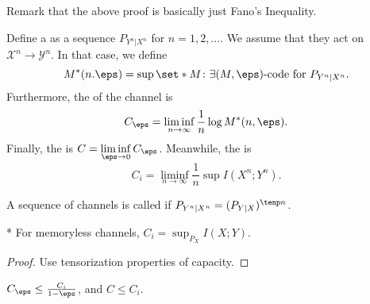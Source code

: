 Remark that the above proof is basically just Fano's Inequality.

\begin{defn}
	Define a  as a sequence $P_{Y^n|X^n}$ for $n = 1, 2, \ldots$.
	We assume that they act on $\mathcal X^n \to \mathcal Y^n$.
	In that case, we define \[
		M^*(n.\eps) = \sup \set*{M\colon \exists (M,\eps)\text{-code for }P_{Y^n|X^n}}.
	\]
	Furthermore, the  of the channel is \[
		C_\eps = \liminf_{n\to \infty} \frac 1n \log M^*(n,\eps).
	\]
	Finally, the  is $C = \liminf\limits_{\eps\to 0} C_\eps$. Meanwhile, the  is \[
		C_i = \liminf_{n\to\infty} \frac 1n \sup I(X^n;Y^n).
	\]
\end{defn}

\begin{defn}
	A sequence of channels is called  if $P_{Y^n|X^n} = (P_{Y|X})^{\tenp n}$.
\end{defn}

\begin{fact}*
	For memoryless channels, $C_i = \sup_{P_X} I(X;Y)$.
\end{fact}

\begin{proof}
	Use tensorization properties of capacity.
\end{proof}

\begin{cor}
	$C_\eps \leq \frac{C_i}{1-\eps}$, and $C \leq C_i$.
\end{cor}


